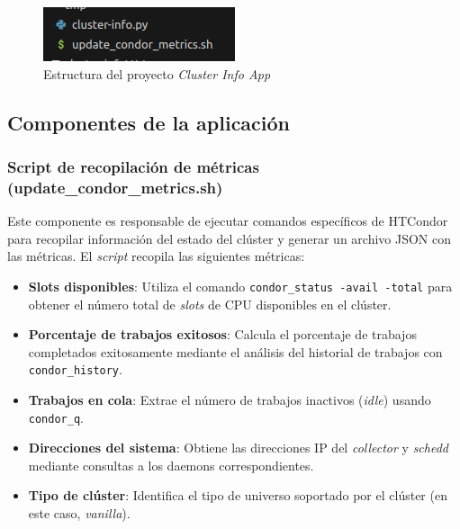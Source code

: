 \begin{figure}[H]
	\centering
	\includegraphics[scale=0.7]{tablas-images/pmv/estructura-proyecto-cluster-info-app.png}
	\caption{Estructura del proyecto \textit{Cluster Info App}}
	\label{fig:estructura-proyecto-cluster-info-app}
\end{figure}

\subsection{Componentes de la aplicación}
\noindent

\subsubsection{Script de recopilación de métricas (update\_condor\_metrics.sh)}
\noindent

Este componente es responsable de ejecutar comandos específicos de HTCondor para recopilar información del estado del clúster y generar un archivo JSON con las métricas. El \textit{script} recopila las siguientes métricas:

\begin{itemize}
	\item \textbf{Slots disponibles}: Utiliza el comando \texttt{condor\_status -avail -total} para obtener el número total de \textit{slots} de CPU disponibles en el clúster.
	
	\item \textbf{Porcentaje de trabajos exitosos}: Calcula el porcentaje de trabajos completados exitosamente mediante el análisis del historial de trabajos con \texttt{condor\_history}.
	
	\item \textbf{Trabajos en cola}: Extrae el número de trabajos inactivos (\textit{idle}) usando \texttt{condor\_q}.
	
	\item \textbf{Direcciones del sistema}: Obtiene las direcciones IP del \textit{collector} y \textit{schedd} mediante consultas a los daemons correspondientes.
	
	\item \textbf{Tipo de clúster}: Identifica el tipo de universo soportado por el clúster (en este caso, \textit{vanilla}).
\end{itemize}

